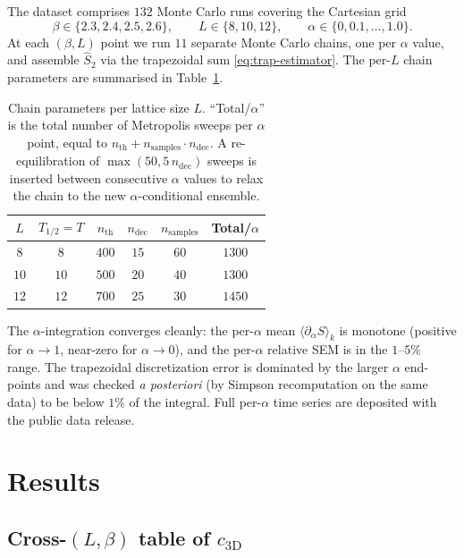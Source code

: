 \documentclass[11pt,a4paper]{article}
\theoremstyle{definition}
\newcommand{\threeD}{{3\text{D}}}
\begin{document}
The dataset comprises $132$ Monte Carlo runs covering the Cartesian
grid
\begin{equation}
   \beta\in\{2.3,2.4,2.5,2.6\}, \qquad
   L\in\{8,10,12\}, \qquad
   \alpha\in\{0,0.1,\ldots,1.0\}.
   \label{eq:scan-grid}
\end{equation}
At each $(\beta, L)$ point we run $11$ separate Monte Carlo chains,
one per $\alpha$ value, and assemble $\widehat S_{2}$ via the
trapezoidal sum \eqref{eq:trap-estimator}. The per-$L$ chain
parameters are summarised in Table~\ref{tab:run-config}.

\begin{table}[tb]
\centering
\caption{Chain parameters per lattice size $L$. ``Total/$\alpha$''
is the total number of Metropolis sweeps per $\alpha$ point, equal
to $n_{\mathrm{th}} + n_{\mathrm{samples}}\cdot n_{\mathrm{dec}}$.
A re-equilibration of $\max(50, 5\,n_{\mathrm{dec}})$ sweeps is
inserted between consecutive $\alpha$ values to relax the chain to
the new $\alpha$-conditional ensemble.}
\label{tab:run-config}
\renewcommand{\arraystretch}{1.1}
\begin{tabular}{cccccc}
\toprule
$L$ & $T_{1/2} = T$ & $n_{\mathrm{th}}$ & $n_{\mathrm{dec}}$ &
$n_{\mathrm{samples}}$ & Total/$\alpha$ \\
\midrule
$8$  & $8$  & $400$ & $15$ & $60$ & $1300$ \\
$10$ & $10$ & $500$ & $20$ & $40$ & $1300$ \\
$12$ & $12$ & $700$ & $25$ & $30$ & $1450$ \\
\bottomrule
\end{tabular}
\end{table}

The $\alpha$-integration converges cleanly: the per-$\alpha$ mean
$\langle \partial_{\alpha}S\rangle_{k}$ is monotone (positive for
$\alpha\to 1$, near-zero for $\alpha\to 0$), and the per-$\alpha$
relative SEM is in the $1$--$5\%$ range. The trapezoidal discretization
error is dominated by the larger $\alpha$ end-points and was checked
\emph{a posteriori} (by Simpson recomputation on the same data) to
be below $1\%$ of the integral. Full per-$\alpha$ time series are
deposited with the public data release.


\section{Results}
\label{sec:results}

\subsection{Cross-$(L,\beta)$ table of $c_{\threeD}$}
\label{sec:table}
\end{document}
